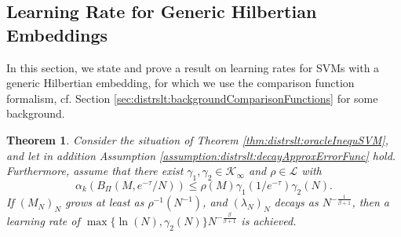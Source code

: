 \documentclass[letterpaper]{article} %
\newcommand{\cK}{\mathcal{K}} %
\newcommand{\cL}{\mathcal{L}} %
\newcommand{\hilbertianEmbed}{\Pi} %
\newcommand{\hilbertianEmbedBound}{B_\hilbertianEmbed} %
\newcommand{\cKi}{\cK_\infty} %
\newtheorem{theorem}{Theorem}
\begin{document}
\subsection{Learning Rate for Generic Hilbertian Embeddings} \label{sec:distrslt:learningRateGenericHilbertianEmbedding}
In this section, we state and prove a result on learning rates for SVMs with a generic Hilbertian embedding, for which we use the comparison function formalism, cf. Section \ref{sec:distrslt:backgroundComparisonFunctions} for some background.
\begin{theorem} \label{thm:distrslt:learningRateSVMgenericApproxErrorFunc}
Consider the situation of Theorem \ref{thm:distrslt:oracleInequSVM}, and let in addition Assumption \ref{assumption:distrslt:decayApproxErrorFunc} hold.
Furthermore, assume that there exist $\gamma_1,\gamma_2\in\cKi$ and $\rho\in\cL$ with
\begin{equation}
\alpha_k\left(\hilbertianEmbedBound(M,e^{-\tau}/N)\right) \leq \rho(M)\gamma_1(1/e^{-\tau})\gamma_2(N).
\end{equation}
If $(M_N)_N$ grows at least as $\rho^{-1}(N^{-1})$, and $(\lambda_N)_N$ decays as $N^{-\frac{1}{\beta+1}}$, then a learning rate of
$\max\{\ln(N),\gamma_2(N)\}N^{-\frac{\beta}{\beta+1}}$ is achieved.
\end{theorem}
\end{document}
